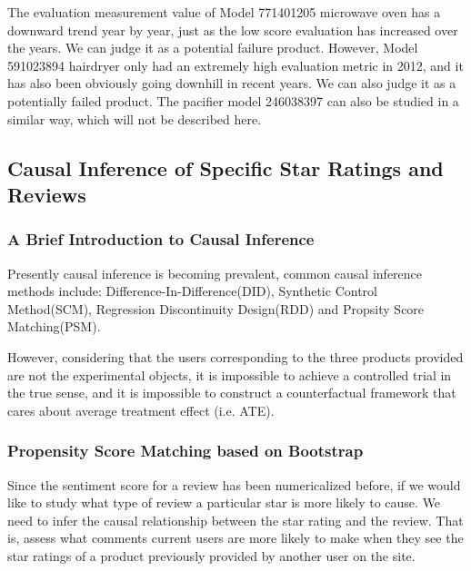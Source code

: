 \documentclass{mcmthesis}
\newcommand{\upcite}[1]{\textsuperscript{\textsuperscript{\cite{#1}}}}
\begin{document}
The evaluation measurement value of Model 771401205 microwave oven has a downward trend year by year, just as the low score evaluation has increased over the years. We can judge it as a potential failure product. However, Model 591023894 hairdryer only had an extremely high evaluation metric in 2012, and it has also been obviously going downhill in recent years. We can also judge it as a potentially failed product. The pacifier model 246038397 can also be studied in a similar way, which will not be described here.

\subsection{Causal Inference of Specific Star Ratings and Reviews}
\subsubsection{A Brief Introduction to Causal Inference}
Presently causal inference is becoming prevalent\upcite{9}, common causal inference methods include: Difference-In-Difference(DID), Synthetic Control Method(SCM), Regression Discontinuity Design(RDD) and Propsity Score Matching(PSM)\upcite{10}. 

However, considering that the users corresponding to the three products provided are not the experimental objects, it is impossible to achieve a controlled trial\upcite{11} in the true sense, and it is impossible to construct a counterfactual framework that cares about average treatment effect\upcite{12} (i.e. ATE).

\subsubsection{Propensity Score Matching based on Bootstrap}
Since the sentiment score for a review has been numericalized before, if we would like to study what type of review a particular star is more likely to cause. We need to infer the causal relationship between the star rating and the review. That is, assess what comments current users are more likely to make when they see the star ratings of a product previously provided by another user on the site.
\end{document}
